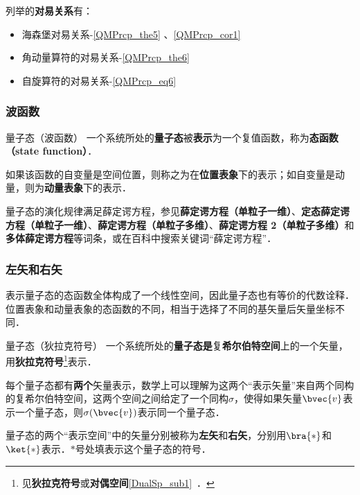 列举的\textbf{对易关系}有：

\begin{itemize}
\item 海森堡对易关系-\autoref{QMPrcp_the5} 、\autoref{QMPrcp_cor1} 
\item 角动量算符的对易关系-\autoref{QMPrcp_the6} 
\item 自旋算符的对易关系-\autoref{QMPrcp_eq6} 
\end{itemize}



\subsubsection{波函数}

\begin{definition}{量子态（波函数）}\label{QMPrcp_def6}
一个系统所处的\textbf{量子态}被\textbf{表示}为一个复值函数，称为\textbf{态函数（state function）}．

如果该函数的自变量是空间位置，则称之为在\textbf{位置表象}下的表示；如自变量是动量，则为\textbf{动量表象}下的表示．
\end{definition}

量子态的演化规律满足薛定谔方程，参见\textbf{薛定谔方程（单粒子一维）}、\textbf{定态薛定谔方程（单粒子一维）}、\textbf{薛定谔方程（单粒子多维）}、\textbf{薛定谔方程 2（单粒子多维）}和\textbf{多体薛定谔方程}等词条，或在百科中搜索关键词“薛定谔方程”．

\subsubsection{左矢和右矢}

表示量子态的态函数全体构成了一个线性空间，因此量子态也有等价的代数诠释．位置表象和动量表象的态函数的不同，相当于选择了不同的基矢量后矢量坐标不同．

\begin{definition}{量子态（狄拉克符号）}\label{QMPrcp_def4}
一个系统所处的\textbf{量子态}\textbf{是}复\textbf{希尔伯特空间}上的一个矢量，用\textbf{狄拉克符号}\footnote{见\textbf{狄拉克符号}或\textbf{对偶空间}\autoref{DualSp_sub1}~．}表示．

每个量子态都有\textbf{两个}矢量表示，数学上可以理解为这两个“表示矢量”来自两个同构的复希尔伯特空间，这两个空间之间给定了一个同构$\sigma$，使得如果矢量$\bvec{v}$表示一个量子态，则$\sigma(\bvec{v})$表示同一个量子态．

量子态的两个“表示空间”中的矢量分别被称为\textbf{左矢}和\textbf{右矢}，分别用$\bra{*}$和$\ket{*}$表示．$*$号处填表示这个量子态的符号．

\end{definition}

